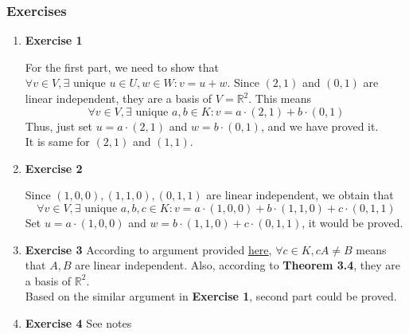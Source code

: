 \documentclass[11pt]{article}
\begin{document}
\subsubsection{Exercises}
\label{sec:org94305b3}
\begin{enumerate}
\item \textbf{Exercise 1}
\label{sec:org166958c}

For the first part, we need to show that \(\forall v\in V, \exists \text{ unique } u\in U, w\in W: v=u+w\). Since \((2,1)\) and \((0,1)\) are linear independent, they are a basis of \(V=\mathbb{R}^2\). This means
$$\forall v\in V, \exists \text{ unique } a,b\in K: v=a\cdot (2,1)+b\cdot (0,1)$$
Thus, just set \(u=a\cdot (2,1)\) and \(w=b\cdot (0,1)\), and we have proved it.\\
It is same for \((2,1)\) and \((1,1)\).
\item \textbf{Exercise 2}
\label{sec:orgc7011ad}

Since \((1,0,0), (1,1,0), (0,1,1)\) are linear independent, we obtain that
$$\forall v\in V, \exists \text{ unique } a,b,c\in K: v=a\cdot (1,0,0)+b\cdot (1,1,0)+ c\cdot (0,1,1)$$
Set \(u=a\cdot (1,0,0)\) and \(w=b\cdot (1,1,0)+ c\cdot (0,1,1)\), it would be proved.
\item \textbf{Exercise 3}
\label{sec:orgce4b716}
According to argument provided \hyperref[org8baa3fd]{here}, \(\forall c\in K,cA\not =B\) means that \(A,B\) are linear independent. Also, according to \textbf{Theorem 3.4}, they are a basis of \(\mathbb{R}^2\).\\
Based on the similar argument in \textbf{Exercise 1}, second part could be proved.
\item \textbf{Exercise 4}
\label{sec:org6de2949}
See notes
\end{enumerate}
\end{document}
